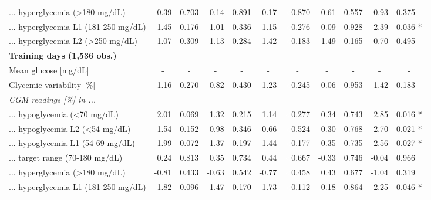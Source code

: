 \documentclass[11pt,a4paper]{article}
\newcommand{\nl}[0]{\textcolor{white}{<}}
\begin{document}
\begin{threeparttable}
\begin{tabular}{@{}l rl rl rl rl rl@{}}
        ... hyperglycemia (>180 mg/dL)                    & -0.39 &  0.703 & -0.14 &  0.891 & -0.17 & \nl0.870     &  0.61 &  0.557 & -0.93 &  0.375   \\
        \hspace{3mm} ... hyperglycemia L1 (181-250 mg/dL) & -1.45 &  0.176 & -1.01 &  0.336 & -1.15 & \nl0.276     & -0.09 &  0.928 & -2.39 &  0.036 * \\
        \hspace{3mm} ... hyperglycemia L2 (>250 mg/dL)    &  1.07 &  0.309 &  1.13 &  0.284 &  1.42 & \nl0.183     &  1.49 &  0.165 &  0.70 &  0.495   \\
        \midrule
        \textbf{Training days (1,536 obs.)}\\
        Mean glucose [mg/dL] &\multicolumn{1}{c}{-} & \multicolumn{1}{c}{-} & \multicolumn{1}{c}{-} & \multicolumn{1}{c}{-} & \multicolumn{1}{c}{-} & \multicolumn{1}{c}{-} & \multicolumn{1}{c}{-} & \multicolumn{1}{c}{-} & \multicolumn{1}{c}{-} & \multicolumn{1}{c}{-}\\
        Glycemic variability [\%]                         &  1.16 &  0.270 &  0.82 &  0.430 &  1.23 & \nl0.245     &  0.06 &  0.953 &  1.42 &  0.183   \\
        \textit{CGM readings [\%] in ...} \\
        ... hypoglycemia (<70 mg/dL)                      &  2.01 &  0.069 &  1.32 &  0.215 &  1.14 & \nl0.277     &  0.34 &  0.743 &  2.85 &  0.016 * \\
        \hspace{3mm} ... hypoglycemia L2 (<54 mg/dL)      &  1.54 &  0.152 &  0.98 &  0.346 &  0.66 & \nl0.524     &  0.30 &  0.768 &  2.70 &  0.021 * \\
        \hspace{3mm} ... hypoglycemia L1 (54-69 mg/dL)    &  1.99 &  0.072 &  1.37 &  0.197 &  1.44 & \nl0.177     &  0.35 &  0.735 &  2.56 &  0.027 * \\
        ... target range (70-180 mg/dL)                   &  0.24 &  0.813 &  0.35 &  0.734 &  0.44 & \nl0.667     & -0.33 &  0.746 & -0.04 &  0.966   \\
        ... hyperglycemia (>180 mg/dL)                    & -0.81 &  0.433 & -0.63 &  0.542 & -0.77 & \nl0.458     &  0.43 &  0.677 & -1.04 &  0.319   \\
        \hspace{3mm} ... hyperglycemia L1 (181-250 mg/dL) & -1.82 &  0.096 & -1.47 &  0.170 & -1.73 & \nl0.112     & -0.18 &  0.864 & -2.25 &  0.046 * \\

\end{tabular}
\end{threeparttable}
\end{document}
